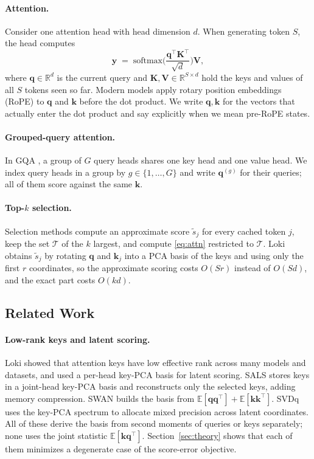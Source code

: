 \documentclass[10pt]{article}
\newcommand{\R}{\mathbb{R}}
\newcommand{\E}{\mathbb{E}}
\newcommand{\bq}{\mathbf{q}}
\newcommand{\bk}{\mathbf{k}}
\newcommand{\bK}{\mathbf{K}}
\newcommand{\bV}{\mathbf{V}}
\theoremstyle{plain}
\theoremstyle{definition}
\theoremstyle{remark}
\begin{document}
\paragraph{Attention.}
Consider one attention head with head dimension $d$. When generating token
$S$, the head computes
\begin{equation}
  \label{eq:attn}
  \mathbf{y} \;=\; \mathrm{softmax}\!\Big(\frac{\bq^\top \bK^\top}{\sqrt{d}}\Big)\bV,
\end{equation}
where $\bq\in\R^{d}$ is the current query and $\bK,\bV\in\R^{S\times d}$ hold
the keys and values of all $S$ tokens seen so far. Modern models apply rotary
position embeddings (RoPE) \citep{rope} to $\bq$ and $\bk$ before the dot
product. We write $\bq,\bk$ for the vectors that actually enter the dot
product and say explicitly when we mean pre-RoPE states.

\paragraph{Grouped-query attention.}
In GQA \citep{gqa}, a group of $G$ query heads shares one key head and one
value head. We index query heads in a group by $g\in\{1,\dots,G\}$ and write
$\bq^{(g)}$ for their queries; all of them score against the same $\bk$.

\paragraph{Top-$k$ selection.}
Selection methods compute an approximate score $\tilde s_j$ for every cached
token $j$, keep the set $\mathcal{T}$ of the $k$ largest, and compute
\eqref{eq:attn} restricted to $\mathcal{T}$. Loki obtains $\tilde s_j$ by
rotating $\bq$ and $\bk_j$ into a PCA basis of the keys and using only the
first $r$ coordinates, so the approximate scoring costs $O(Sr)$ instead of
$O(Sd)$, and the exact part costs $O(kd)$.

\subsection{Related Work}

\paragraph{Low-rank keys and latent scoring.}
Loki \citep{loki} showed that attention keys have low effective rank across
many models and datasets, and used a per-head key-PCA basis for latent
scoring. SALS \citep{sals} stores keys in a joint-head key-PCA basis and
reconstructs only the selected keys, adding memory compression. SWAN
\citep{swan} builds the basis from $\E[\bq\bq^\top]+\E[\bk\bk^\top]$. SVDq
\citep{svdq} uses the key-PCA spectrum to allocate mixed precision across
latent coordinates. All of these derive the basis from second moments of
queries or keys separately; none uses the joint statistic $\E[\bk\bq^\top]$.
Section~\ref{sec:theory} shows that each of them minimizes a degenerate case
of the score-error objective.
\end{document}
